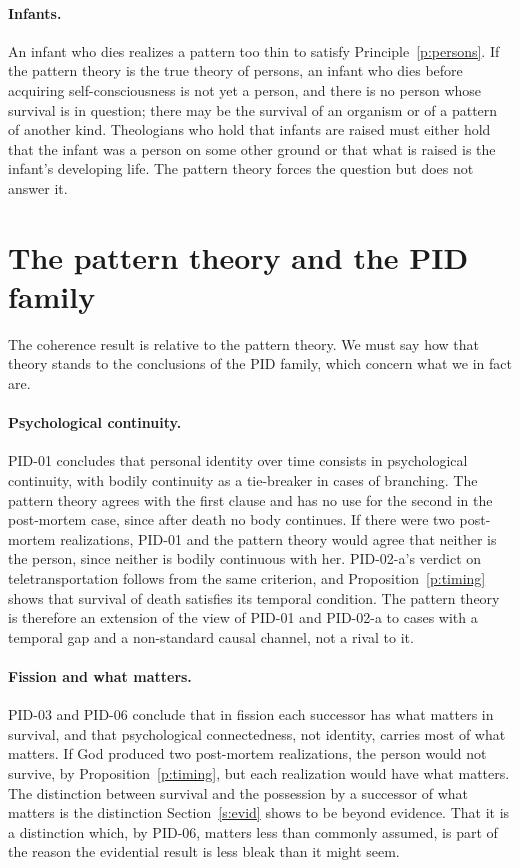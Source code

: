 \documentclass{situationist-preprint}
\begin{document}
\paragraph{Infants.} An infant who dies realizes a pattern too thin to satisfy Principle~\ref{p:persons}. If the pattern theory is the true theory of persons, an infant who dies before acquiring self-consciousness is not yet a person, and there is no person whose survival is in question; there may be the survival of an organism or of a pattern of another kind. Theologians who hold that infants are raised must either hold that the infant was a person on some other ground or that what is raised is the infant's developing life. The pattern theory forces the question but does not answer it.

\section{The pattern theory and the PID family}\label{s:pid}

The coherence result is relative to the pattern theory. We must say how that theory stands to the conclusions of the PID family, which concern what we in fact are.

\paragraph{Psychological continuity.} PID-01 concludes that personal identity over time consists in psychological continuity, with bodily continuity as a tie-breaker in cases of branching. The pattern theory agrees with the first clause and has no use for the second in the post-mortem case, since after death no body continues. If there were two post-mortem realizations, PID-01 and the pattern theory would agree that neither is the person, since neither is bodily continuous with her. PID-02-a's verdict on teletransportation follows from the same criterion, and Proposition~\ref{p:timing} shows that survival of death satisfies its temporal condition. The pattern theory is therefore an extension of the view of PID-01 and PID-02-a to cases with a temporal gap and a non-standard causal channel, not a rival to it.

\paragraph{Fission and what matters.} PID-03 and PID-06 conclude that in fission each successor has what matters in survival, and that psychological connectedness, not identity, carries most of what matters. If God produced two post-mortem realizations, the person would not survive, by Proposition~\ref{p:timing}, but each realization would have what matters. The distinction between survival and the possession by a successor of what matters is the distinction Section~\ref{s:evid} shows to be beyond evidence. That it is a distinction which, by PID-06, matters less than commonly assumed, is part of the reason the evidential result is less bleak than it might seem.
\end{document}
